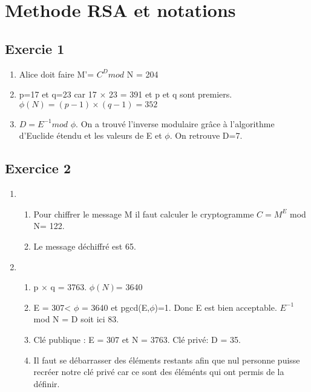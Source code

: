 \documentclass[titlepage]{article}
\begin{document}
\section{Methode RSA et notations}
\subsection{Exercie 1}

\begin{enumerate}
    \item \begin{enumerate}
    Alice doit faire M'= $C^{D} mod$ N = 204
    \end{enumerate}
    \item \begin{enumerate}
    p=17 et q=23 car 17 $\times$ 23 = 391 et p et q sont premiers. $\phi(N)= (p-1) \times (q-1) = 352$
    \end{enumerate}
    \item \begin{enumerate}
    $D=E^{-1} mod$ $\phi$. On a trouvé l'inverse modulaire grâce à l'algorithme d'Euclide étendu et les valeurs de E et $\phi$. On retrouve D=7.  
    \end{enumerate}
\end{enumerate}
\subsection{Exercice 2}

\begin{enumerate}
    \item \begin{enumerate}
    \item Pour chiffrer le message M il faut calculer le cryptogramme  $C=M^{E}$ mod N= 122.
    \item Le message déchiffré est 65. 
    \end{enumerate}
    \item \begin{enumerate}
    \item p $\times$ q = 3763. $\phi(N)$= 3640
    \item E = 307< $\phi$ = 3640 et pgcd(E,$\phi$)=1. Donc E est bien acceptable. $E^{-1}$ mod N = D soit ici 83.
    \item Clé publique : E = 307 et N = 3763. Clé privé: D = 35.
    \item Il faut se débarrasser des éléments restants afin que nul personne puisse recréer notre clé privé car ce sont des éléménts qui ont permis de la définir.
    \end{enumerate}
\end{enumerate}
\end{document}
